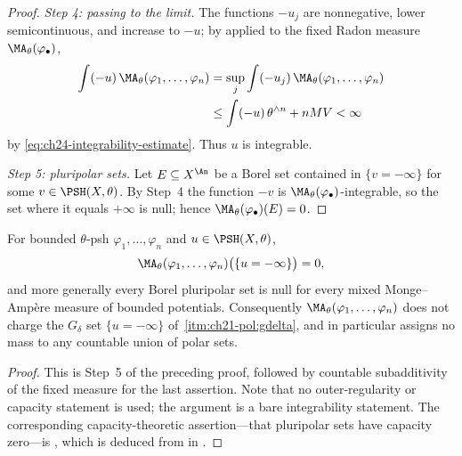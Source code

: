 \begin{proof}
\emph{Step 4: passing to the limit.}  The functions $-u_j$ are
nonnegative, lower semicontinuous, and increase to $-u$; by
 applied to the fixed Radon measure
$\MA_\theta(\varphi_\bullet)$,
\[
 \begin{aligned}
 \int(-u)\,\MA_\theta(\varphi_1,\ldots,\varphi_n)
 &=\sup_j\int(-u_j)\,\MA_\theta(\varphi_1,\ldots,\varphi_n)\\
 &\leq\int(-u)\,\theta^{\wedge n}+nMV<\infty
 \end{aligned}
\]
by \eqref{eq:ch24-integrability-estimate}.  Thus $u$ is integrable.

\emph{Step 5: pluripolar sets.}  Let $E\subseteq X^{\An}$ be a Borel set
contained in $\{v=-\infty\}$ for some $v\in\PSH(X,\theta)$.  By Step~4
the function $-v$ is $\MA_\theta(\varphi_\bullet)$-integrable, so the set
where it equals $+\infty$ is null; hence
$\MA_\theta(\varphi_\bullet)(E)=0$.
\end{proof}

\begin{corollary}
\label{cor:ch24-no-charge}
For bounded $\theta$-psh $\varphi_1,\ldots,\varphi_n$ and
$u\in\PSH(X,\theta)$,
\[
 \MA_\theta(\varphi_1,\ldots,\varphi_n)\bigl(\{u=-\infty\}\bigr)=0 ,
\]
and more generally every Borel pluripolar set is null for every mixed
Monge--Amp\`ere measure of bounded potentials.  Consequently
$\MA_\theta(\varphi_1,\ldots,\varphi_n)$ does not charge the
$G_\delta$ set $\{u=-\infty\}$ of
\,\cref{itm:ch21-pol:gdelta}, and in
particular assigns no mass to any countable union of polar sets.
\end{corollary}

\begin{proof}
This is Step~5 of the preceding proof, followed by countable subadditivity
of the fixed measure for the last assertion.  Note that no outer-regularity
or capacity statement is used; the argument is a bare integrability
statement.  The corresponding capacity-theoretic assertion---that pluripolar
sets have capacity zero---is , which is
deduced from  in
.
\end{proof}

